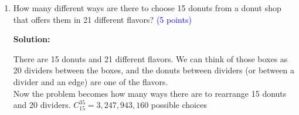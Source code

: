 \documentclass{article}
\newcommand{\pt}[1]{\textcolor{blue}{(#1 points)}}
\newenvironment{solution}
{
\par
\color{blue}
\textbf{Solution:}
}
{
\par
}
\begin{document}
\begin{enumerate}
\begin{solution}
For the product of a series of numbers to be odd, they must all be odd\\
Begins with number: $10 \cdot 63^4$\\
Begins with number, no even numbers: $5 \cdot 58^4$\\
Begins with number, at least 1 even number: $10 \cdot 63^4 - 5 \cdot 58^4 = 100,947,130$

Note the constraint that a password cannot begin with an underscore is already satisfied because our three cases exclusively consider passwords that start with vowels, consonants, and numbers. There are no other possibilities for the first character.

Summing up the three cases: $302,447,260$ possible passwords
\end{solution}

\item How many different ways are there to choose 15 donuts from a donut shop that offers them in 21 different flavors?  \pt{5}
\begin{solution}
There are 15 donuts and 21 different flavors. We can think of those boxes as 20 dividers between the boxes, and the donuts between dividers (or between a divider and an edge) are one of the flavors.\\
Now the problem becomes how many ways there are to rearrange 15 donuts and 20 dividers. $C^{35}_{15} = 3,247,943,160$ possible choices
\end{solution}


\end{enumerate}
\end{document}

